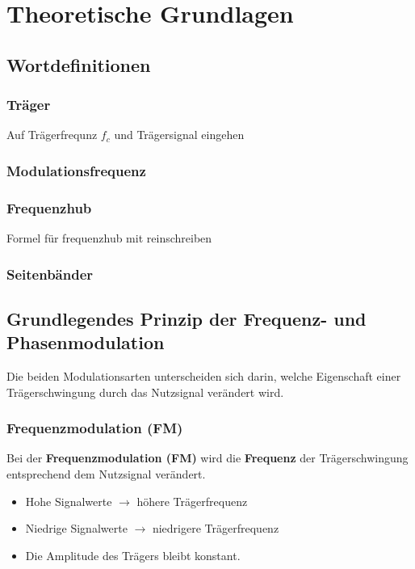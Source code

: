 \documentclass[12pt]{scrartcl}
\begin{document}
\tableofcontents 
\newpage 
\listoffigures 
\listoftables 
\newpage %
\section{Theoretische Grundlagen}


\subsection{Wortdefinitionen}
\subsubsection*{Träger}
 Auf Trägerfrequnz $f_c$ und Trägersignal eingehen 

\subsubsection*{Modulationsfrequenz}
\subsubsection*{Frequenzhub}\label{sec:frequenzhub}
Formel für frequenzhub mit reinschreiben 
\subsubsection*{Seitenbänder}

\subsection{Grundlegendes Prinzip der Frequenz- und Phasenmodulation}

Die beiden Modulationsarten unterscheiden sich darin, welche Eigenschaft einer Trägerschwingung durch das Nutzsignal verändert wird.

\subsubsection{Frequenzmodulation (FM)}

Bei der \textbf{Frequenzmodulation (FM)} wird die \textbf{Frequenz} der Trägerschwingung entsprechend dem Nutzsignal verändert.

\begin{itemize}
    \item Hohe Signalwerte $\rightarrow$ höhere Trägerfrequenz
    \item Niedrige Signalwerte $\rightarrow$ niedrigere Trägerfrequenz
    \item Die Amplitude des Trägers bleibt konstant.
\end{itemize}
\end{document}

